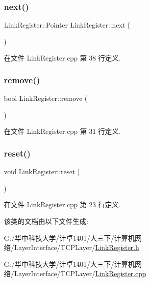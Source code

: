 \subsubsection{\texorpdfstring{next()}{next()}}
{\footnotesize\ttfamily Link\+Register\+::\+Pointer Link\+Register\+::next (\begin{DoxyParamCaption}{ }\end{DoxyParamCaption})}



在文件 Link\+Register.\+cpp 第 38 行定义.

\mbox{\label{class_link_register_ac894e7263eeeeb67bc6cfa8f37c18713}} 
\subsubsection{\texorpdfstring{remove()}{remove()}}
{\footnotesize\ttfamily bool Link\+Register\+::remove (\begin{DoxyParamCaption}{ }\end{DoxyParamCaption})}



在文件 Link\+Register.\+cpp 第 31 行定义.

\mbox{\label{class_link_register_aac227d321f4fed2ebd7b661eb554604b}} 
\subsubsection{\texorpdfstring{reset()}{reset()}}
{\footnotesize\ttfamily void Link\+Register\+::reset (\begin{DoxyParamCaption}{ }\end{DoxyParamCaption})}



在文件 Link\+Register.\+cpp 第 23 行定义.



该类的文档由以下文件生成\+:\begin{DoxyCompactItemize}
\item 
G\+:/华中科技大学/计卓1401/大三下/计算机网络/\+Layer\+Interface/\+T\+C\+P\+Layer/\hyperlink{_link_register_8h}{Link\+Register.\+h}\item 
G\+:/华中科技大学/计卓1401/大三下/计算机网络/\+Layer\+Interface/\+T\+C\+P\+Layer/\hyperlink{_link_register_8cpp}{Link\+Register.\+cpp}\end{DoxyCompactItemize}
